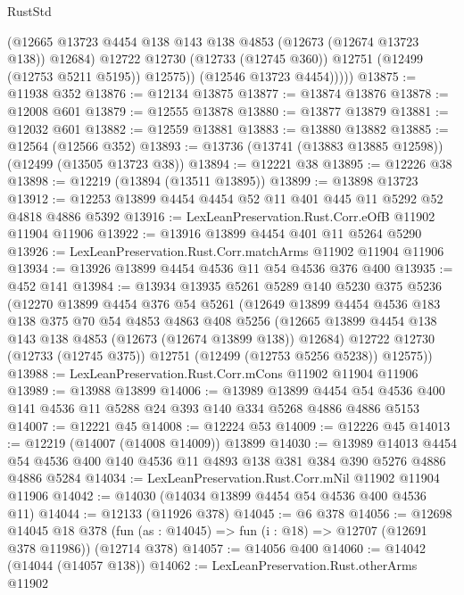 \begin{lexlean}{RustStd}
\begin{coremodule}
                (@12665 @13723 @4454 @138 @143 @138 @4853 (@12673 (@12674 @13723 @138)) @12684)
                @12722
                @12730
                (@12733 (@12745 @360))
                @12751
                (@12499 (@12753 @5211 @5195))
                @12575))
            (@12546 @13723 @4454)))))
@13875 := @11938 @352
@13876 := @12134 @13875
@13877 := @13874 @13876
@13878 := @12008 @601
@13879 := @12555 @13878
@13880 := @13877 @13879
@13881 := @12032 @601
@13882 := @12559 @13881
@13883 := @13880 @13882
@13885 := @12564 (@12566 @352)
@13893 := @13736 (@13741 (@13883 @13885 @12598)) (@12499 (@13505 @13723 @38))
@13894 := @12221 @38
@13895 := @12226 @38
@13898 := @12219 (@13894 (@13511 @13895))
@13899 := @13898 @13723
@13912 := @12253 @13899 @4454 @4454 @52 @11 @401 @445 @11 @5292 @52 @4818 @4886 @5392
@13916 := LexLeanPreservation.Rust.Corr.eOfB @11902 @11904 @11906
@13922 := @13916 @13899 @4454 @401 @11 @5264 @5290
@13926 := LexLeanPreservation.Rust.Corr.matchArms @11902 @11904 @11906
@13934 := @13926 @13899 @4454 @4536 @11 @54 @4536 @376 @400
@13935 := @452 @141
@13984 := @13934
    @13935
    @5261
    @5289
    @140
    @5230
    @375
    @5236
    (@12270
      @13899
      @4454
      @376
      @54
      @5261
      (@12649
        @13899
        @4454
        @4536
        @183
        @138
        @375
        @70
        @54
        @4853
        @4863
        @408
        @5256
        (@12665 @13899 @4454 @138 @143 @138 @4853 (@12673 (@12674 @13899 @138)) @12684)
        @12722
        @12730
        (@12733 (@12745 @375))
        @12751
        (@12499 (@12753 @5256 @5238))
        @12575))
@13988 := LexLeanPreservation.Rust.Corr.mCons @11902 @11904 @11906
@13989 := @13988 @13899
@14006 := @13989
    @13899
    @4454
    @54
    @4536
    @400
    @141
    @4536
    @11
    @5288
    @24
    @393
    @140
    @334
    @5268
    @4886
    @4886
    @5153
@14007 := @12221 @45
@14008 := @12224 @53
@14009 := @12226 @45
@14013 := @12219 (@14007 (@14008 @14009)) @13899
@14030 := @13989
    @14013
    @4454
    @54
    @4536
    @400
    @140
    @4536
    @11
    @4893
    @138
    @381
    @384
    @390
    @5276
    @4886
    @4886
    @5284
@14034 := LexLeanPreservation.Rust.Corr.mNil @11902 @11904 @11906
@14042 := @14030 (@14034 @13899 @4454 @54 @4536 @400 @4536 @11)
@14044 := @12133 (@11926 @378)
@14045 := @6 @378
@14056 := @12698
    @14045
    @18
    @378
    (fun (as : @14045) => fun (i : @18) => @12707 (@12691 @378 @11986))
    (@12714 @378)
@14057 := @14056 @400
@14060 := @14042 (@14044 (@14057 @138))
@14062 := LexLeanPreservation.Rust.otherArms @11902

\end{coremodule}
\end{lexlean}

